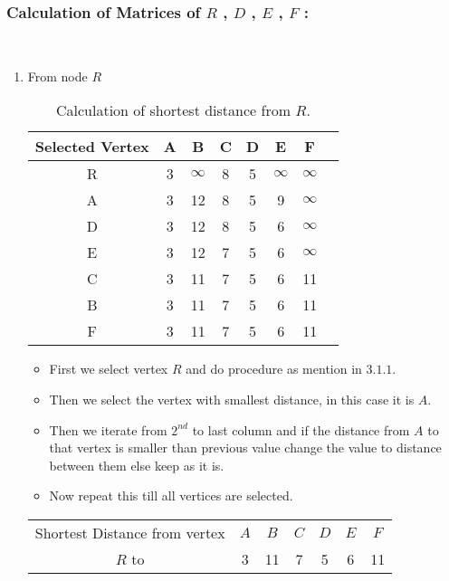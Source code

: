 \documentclass{article}
\begin{document}
        \subsubsection{Calculation of Matrices of $R$ , $D$ , $E$ , $F$ :}\\
        \begin{enumerate}
            \item From node $R$\\
           \begin{table}[h]
               \centering
               \begin{tabular}{|C|c|c|c|c|c|c|c|}
               \hline
                Selected Vertex & A & B & C & D & E & F  \\
                \hline
                R & 3 & $\infty$ & 8 & 5 & $\infty$ & $\infty$ \\
                \hline
                A & 3 & 12 & 8 & 5 & 9 & $\infty$ \\
                \hline
                D & 3 & 12 & 8 & 5 & 6 & $\infty$ \\
                \hline
                E & 3 & 12 & 7 & 5 & 6 & $\infty$ \\
                \hline
                C & 3 & 11 & 7 & 5 & 6 & 11 \\
                \hline
                B & 3 & 11 & 7 & 5 & 6 & 11 \\
                \hline 
                F & 3 & 11 & 7 & 5 & 6 & 11 \\
                \hline
               \end{tabular}
               \caption{Calculation of shortest distance from $R$.}
               \label{tab:my_label}
           \end{table}
           \begin{itemize}
                \item First we select vertex $R$ and do procedure as mention in $3.1.1$.
               \item Then we select the vertex with smallest distance, in this case it is $A$.
               \item Then we iterate from $2^{nd}$ to last column and  if the distance from $A$ to that vertex is smaller than previous value change the value to distance between them else keep as it is. \item Now repeat this till all vertices are selected.
           \end{itemize}
           \begin{table}[h!]
               \centering
               \begin{tabular}{|c|c|c|c|c|c|c|}
               \hline
                   Shortest Distance from vertex & $A$ & $B$ & $C$ & $D$ & $E$ & $F$ \\
                   $R$ to & 3 & 11 & 7 & 5 & 6 & 11 \\
               \hline
               \end{tabular}
               

\end{table}
\end{enumerate}
\end{document}
